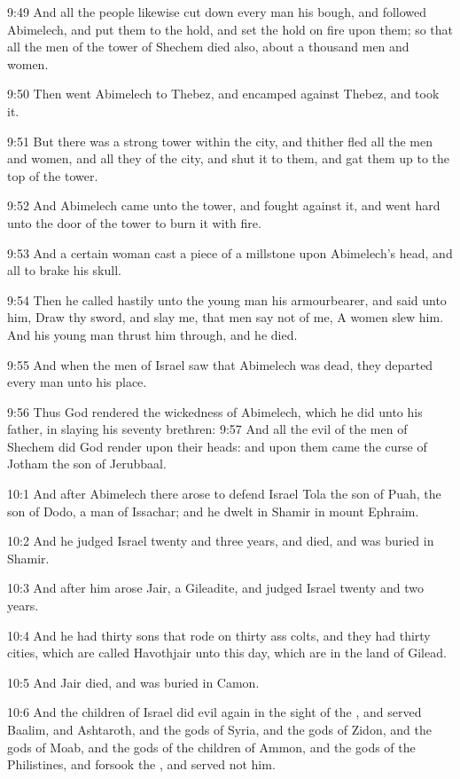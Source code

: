 9:49 And all the people likewise cut down every man his bough, and
followed Abimelech, and put them to the hold, and set the hold on fire
upon them; so that all the men of the tower of Shechem died also,
about a thousand men and women.

9:50 Then went Abimelech to Thebez, and encamped against Thebez, and
took it.

9:51 But there was a strong tower within the city, and thither fled
all the men and women, and all they of the city, and shut it to them,
and gat them up to the top of the tower.

9:52 And Abimelech came unto the tower, and fought against it, and
went hard unto the door of the tower to burn it with fire.

9:53 And a certain woman cast a piece of a millstone upon Abimelech's
head, and all to brake his skull.

9:54 Then he called hastily unto the young man his armourbearer, and
said unto him, Draw thy sword, and slay me, that men say not of me, A
women slew him. And his young man thrust him through, and he died.

9:55 And when the men of Israel saw that Abimelech was dead, they
departed every man unto his place.

9:56 Thus God rendered the wickedness of Abimelech, which he did unto
his father, in slaying his seventy brethren: 9:57 And all the evil of
the men of Shechem did God render upon their heads: and upon them came
the curse of Jotham the son of Jerubbaal.

10:1 And after Abimelech there arose to defend Israel Tola the son of
Puah, the son of Dodo, a man of Issachar; and he dwelt in Shamir in
mount Ephraim.

10:2 And he judged Israel twenty and three years, and died, and was
buried in Shamir.

10:3 And after him arose Jair, a Gileadite, and judged Israel twenty
and two years.

10:4 And he had thirty sons that rode on thirty ass colts, and they
had thirty cities, which are called Havothjair unto this day, which
are in the land of Gilead.

10:5 And Jair died, and was buried in Camon.

10:6 And the children of Israel did evil again in the sight of the
\LORD, and served Baalim, and Ashtaroth, and the gods of Syria, and the
gods of Zidon, and the gods of Moab, and the gods of the children of
Ammon, and the gods of the Philistines, and forsook the \LORD, and
served not him.

